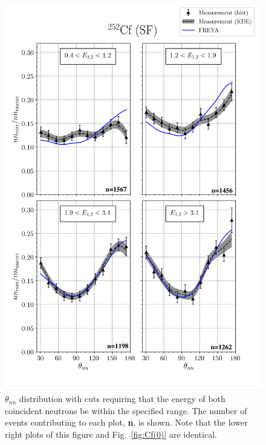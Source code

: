 \begin{figure}
\centering
    \includegraphics[width = \figsize\textwidth]{FinalCf252Resultw_freya2(fix)KDE.png}
    \caption{$\theta_{nn}$ distribution with cuts requiring that the energy of both coincident neutrons be within the specified range.
    The number of events contributing to each plot, \textbf{n}, is shown. Note that the lower right plots of this figure and Fig.~\ref{fig:Cf(0)} are identical.}
    \label{fig:Cf(2)}
\end{figure}

